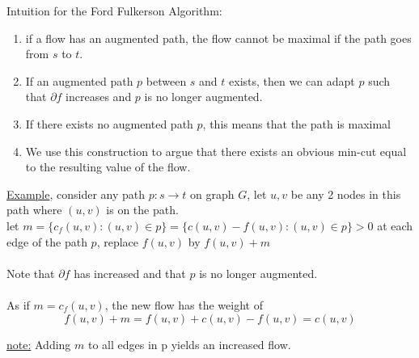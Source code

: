 \documentclass[12pt]{article}
\begin{document}
Intuition for the Ford Fulkerson Algorithm:
\begin{enumerate}
	\item{if a flow has an augmented path, the flow cannot be maximal if the path goes from $s$ to $t$.}
	\item{If an augmented path $p$ between $s$ and $t$ exists, then we can adapt $p$ such that $\partial f$ increases and $p$ is no longer augmented.}
	\item{If there exists no augmented path $p$, this means that the path is maximal}
	\item{We use this construction to argue that there exists an obvious min-cut equal to the resulting value of the flow.}
\end{enumerate}

\underline{Example}, consider any path $p: s \rightarrow t$ on graph $G$, let $u,v$ be any 2 nodes in this path where $(u,v)$ is on the path.\\

let $m = \{ c_f (u,v) : (u,v) \in p \} = \{ c(u,v) - f(u,v) : (u,v) \in p \} > 0$ at each edge of the path $p$, replace $f(u,v)$ by $f(u,v) + m$\\
\\
Note that $\partial f$ has increased and that $p$ is no longer augmented.\\
\\
As if $m = c_f (u,v)$, the new flow has the weight of $$f(u,v) + m = f(u,v) + c(u,v) - f(u,v) = c(u,v)$$
\begin{tcolorbox}
	\underline{note:} Adding $m$ to all edges in p yields an increased flow.
\end{tcolorbox}
\end{document}
